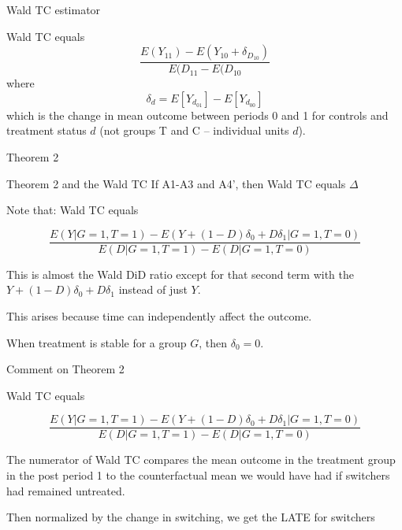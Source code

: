 \documentclass{beamer}
\begin{document}
\begin{frame}{Wald TC estimator}

Wald TC equals $$\frac{
E(Y_{11}) - E(Y_{10} + \delta_{D_{10}})}{E(D_{11} - E(D_{10}}$$where $$\delta_d = E[Y_{d_{01}}] - E[Y_{d_{00}}]$$ which is the change in mean outcome between periods 0 and 1 for controls and treatment status $d$ (not groups T and C -- individual units $d$). 

\end{frame}


\begin{frame}{Theorem 2}

\begin{block}{Theorem 2 and the Wald TC}
If A1-A3 and A4', then Wald TC equals $\Delta$
\end{block}

Note that: Wald TC equals

$$
\frac{
E  (Y | G=1,T=1) - 
E(Y+ (1-D)\delta_0 + D \delta_1 | G=1, T=0 )}{
E(D|G=1,T=1) - E(D|G=1,T=0)}$$

This is almost the Wald DiD ratio except for that second term with the $Y+(1-D)\delta_0 + D\delta_1$ instead of just $Y$. \\

\bigskip 

This arises because time can independently affect the outcome.  \\

\bigskip

When treatment is stable for a group $G$, then $\delta_0=0$. \\


\end{frame}


\begin{frame}{Comment on Theorem 2}

Wald TC equals

$$
\frac{
E  (Y | G=1,T=1) - 
E(Y+ (1-D)\delta_0 + D \delta_1 | G=1, T=0 )}{
E(D|G=1,T=1) - E(D|G=1,T=0)}$$

The numerator of Wald TC compares the mean outcome in the treatment group in the post period 1 to the counterfactual mean we would have had if switchers had remained untreated.  \\

\bigskip 

Then normalized by the change in switching, we get the LATE for switchers

\end{frame}
\end{document}
